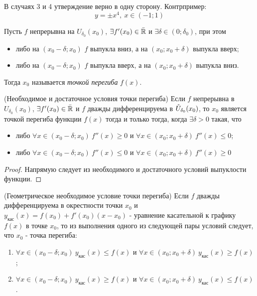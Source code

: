 \begin{note}
	В случаях 3 и 4 утверждение верно в одну сторону. Контрпример: 
	\[
		y = \pm x^4,\ x \in (-1; 1)
	\]
\end{note}

\begin{definition}
	Пусть $f$ непрерывна на $U_{\delta_0}(x_0)$, $\exists f'(x_0) \in \bar{\mathbb{R}}$ и $\exists \delta \in (0; \delta_0)$, при этом
	\begin{itemize}
		\item либо на $(x_0 - \delta; x_0)$ $f$ выпукла вниз, а на $(x_0; x_0 + \delta)$ выпукла вверх;
		
		\item либо на $(x_0 - \delta; x_0)$ $f$ выпукла вверх, а на $(x_0; x_0 + \delta)$ выпукла вниз.
	\end{itemize}
	Тогда $x_0$ называется \textit{точкой перегиба} $f(x)$.
\end{definition}

\begin{theorem} (Необходимое и достаточное условия точки перегиба)
	Если $f$ непрерывна в $U_{\delta_0}(x_0)$, $\exists f'(x_0) \in \bar{\mathbb{R}}$ и $f$ дважды дифференцируема в $\mathring{U}_{\delta_0}(x_0)$, то $x_0$ является точкой перегиба функции $f(x)$ тогда и только тогда, когда $\exists \delta > 0$ такая, что
	\begin{itemize}
		\item либо $\forall x \in (x_0 - \delta; x_0)\ f''(x) \ge 0$ и $\forall x \in (x_0; x_0 + \delta)\ f''(x) \le 0$;
		
		\item либо $\forall x \in (x_0 - \delta; x_0)\ f''(x) \le 0$ и $\forall x \in (x_0; x_0 + \delta)\ f''(x) \ge 0$
	\end{itemize}
\end{theorem}

\begin{proof}
	Напрямую следует из необходимого и достаточного условий выпуклости функции.
\end{proof}

\begin{theorem} (Геометрическое необходимое условие точки перегиба)
	Если $f$ дважды дифференцируема в окрестности точки $x_0$ и $y_{\text{кас}}(x) = f(x_0) + f'(x_0) (x - x_0)$ - уравнение касательной к графику $f(x)$ в точке $x_0$, то из выполнения одного из следующей пары условий следует, что $x_0$ - точка перегиба:
	\begin{enumerate}
		\item $\forall x \in (x_0 - \delta; x_0)\ y_{\text{кас}}(x) \le f(x)$ и $\forall x \in (x_0; x_0 + \delta)\ y_{\text{кас}}(x) \ge f(x)$;
		
		\item $\forall x \in (x_0 - \delta; x_0)\ y_{\text{кас}}(x) \ge f(x)$ и $\forall x \in (x_0; x_0 + \delta)\ y_{\text{кас}}(x) \le f(x)$.
	\end{enumerate}
\end{theorem}

